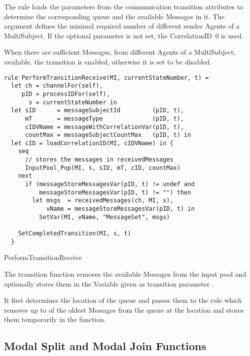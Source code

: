 The  rule loads the parameters from the communication transition attributes to determine the corresponding queue and the available Messages in it. The  argument defines the minimal required number of different sender Agents of a MultiSubject. If the optional parameter  is not set, the CorrelationID~0 is used.

When there are sufficient Messages, from different Agents of a MultiSubject, available, the transition is enabled, otherwise it is set to be disabled.



\begin{listing}[htbp]
\begin{verbatim}
rule PerformTransitionReceive(MI, currentStateNumber, t) =
  let ch = channelFor(self),
     pID = processIDFor(self),
       s = currentStateNumber in
  let sID      = messageSubjectId         (pID, t),
      mT       = messageType              (pID, t),
      cIDVName = messageWithCorrelationVar(pID, t),
      countMax = messageSubjectCountMax   (pID, t) in
  let cID = loadCorrelationID(MI, cIDVName) in {
    seq
      // stores the messages in receivedMessages
      InputPool_Pop(MI, s, sID, mT, cID, countMax)
    next
      if (messageStoreMessagesVar(pID, t) != undef and
          messageStoreMessagesVar(pID, t) != "") then
        let msgs  = receivedMessages(ch, MI, s),
            vName = messageStoreMessagesVar(pID, t) in
          SetVar(MI, vName, "MessageSet", msgs)

    SetCompletedTransition(MI, s, t)
  }
\end{verbatim}
\caption{PerformTransitionReceive}
\label{lst:shortasm:PerformTransitionReceive}
\end{listing}

The transition function removes the available Messages from the input pool and optionally stores them in the Variable given as transition parameter .

It first determines the location of the queue and passes them to the  rule which removes up to  of the oldest Messages from the queue at the location  and stores them temporarily in the  function.


\subsection{Modal Split and Modal Join Functions}


